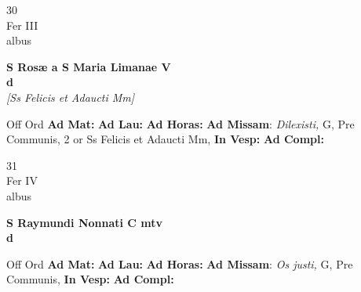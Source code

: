 \documentclass[10pt, openany]{book}
\begin{document}
        \begin{center}
            \begin{minipage}{3.5in}
                \vspace{2em}
                \begin{minipage}{0.5in}
                    {\Huge 30} \\
                    {\normalsize Fer III} \\
                    {\normalsize albus}
                \end{minipage}
                \begin{minipage}{3.0in}
                    \textbf{ \large S Rosæ a S Maria Limanae V \\
                    \textnormal{\normalsize d}} \\ \textit{[Ss Felicis et Adaucti Mm]} \\ 
                \end{minipage}
                \begin{justify}Off Ord
                    \textbf{Ad Mat: }
                    \textbf{Ad Lau: }
                    \textbf{Ad Horas: }\textbf{Ad Missam}: \textit{Dilexisti,} G, Pre Communis, 2 or Ss Felicis et Adaucti Mm,  
                    \textbf{In Vesp: }
                    \textbf{Ad Compl: }
                \end{justify}
            \end{minipage}
        \end{center}
    
        \begin{center}
            \begin{minipage}{3.5in}
                \vspace{2em}
                \begin{minipage}{0.5in}
                    {\Huge 31} \\
                    {\normalsize Fer IV} \\
                    {\normalsize albus}
                \end{minipage}
                \begin{minipage}{3.0in}
                    \textbf{ \large S Raymundi Nonnati C mtv \\
                    \textnormal{\normalsize d}} \\ 
                \end{minipage}
                \begin{justify}Off Ord
                    \textbf{Ad Mat: }
                    \textbf{Ad Lau: }
                    \textbf{Ad Horas: }\textbf{Ad Missam}: \textit{Os justi,} G, Pre Communis,  
                    \textbf{In Vesp: }
                    \textbf{Ad Compl: }
                \end{justify}
            \end{minipage}
        \end{center}
    
\end{document}
